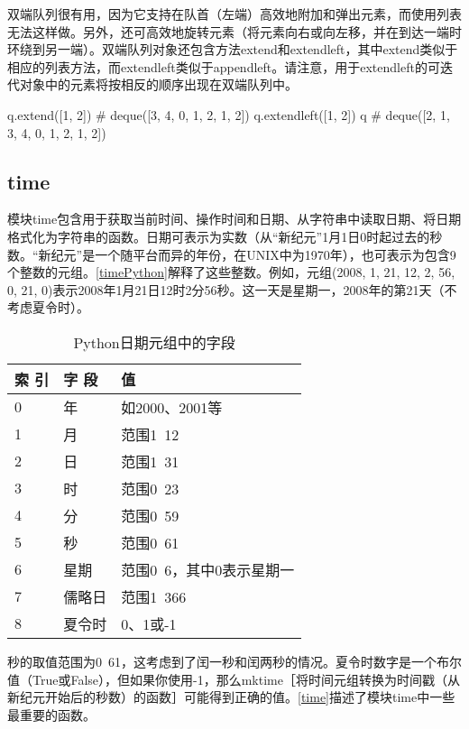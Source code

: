双端队列很有用，因为它支持在队首（左端）高效地附加和弹出元素，而使用列表无法这样做。另外，还可高效地旋转元素（将元素向右或向左移，并在到达一端时环绕到另一端）。双端队列对象还包含方法extend和extendleft，其中extend类似于相应的列表方法，而extendleft类似于appendleft。请注意，用于extendleft的可迭代对象中的元素将按相反的顺序出现在双端队列中。
\begin{pyc}
q.extend([1, 2])
# deque([3, 4, 0, 1, 2, 1, 2])
q.extendleft([1, 2])
q  # deque([2, 1, 3, 4, 0, 1, 2, 1, 2])
\end{pyc}
\subsection{time}
模块time包含用于获取当前时间、操作时间和日期、从字符串中读取日期、将日期格式化为字符串的函数。日期可表示为实数（从“新纪元”1月1日0时起过去的秒数。“新纪元”是一个随平台而异的年份，在UNIX中为1970年），也可表示为包含9个整数的元组。\autoref{timePython}解释了这些整数。例如，元组(2008, 1, 21, 12, 2, 56, 0, 21, 0)表示2008年1月21日12时2分56秒。这一天是星期一，2008年的第21天（不考虑夏令时）。

\begin{table}[H]
    \centering
    \caption{Python日期元组中的字段}
    \label{timePython}
    \begin{tabular}{lll}
        \hline
        索 引 & 字 段 & 值              \\
        \hline
        0   & 年   & 如2000、2001等    \\
        1   & 月   & 范围1~12         \\
        2   & 日   & 范围1~31         \\
        3   & 时   & 范围0~23         \\
        4   & 分   & 范围0~59         \\
        5   & 秒   & 范围0~61         \\
        6   & 星期  & 范围0~6，其中0表示星期一 \\
        7   & 儒略日 & 范围1~366        \\
        8   & 夏令时 & 0、1或-1         \\
        \hline
    \end{tabular}
\end{table}

秒的取值范围为0~61，这考虑到了闰一秒和闰两秒的情况。夏令时数字是一个布尔值（True或False），但如果你使用-1，那么mktime［将时间元组转换为时间戳（从新纪元开始后的秒数）的函数］可能得到正确的值。\autoref{time}描述了模块time中一些最重要的函数。

